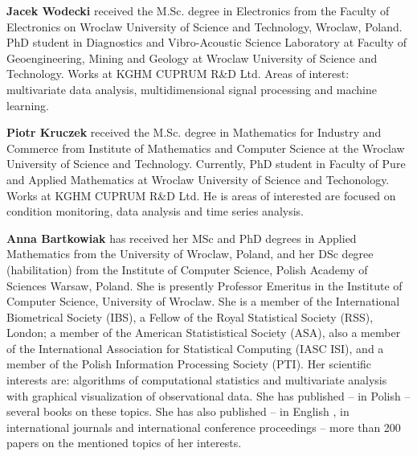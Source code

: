 \documentclass[conference,a4paper]{IEEEtran}
\begin{document}

%
%
%







\textbf{Jacek Wodecki} received the M.Sc. degree in Electronics from the Faculty of Electronics on Wroclaw University of  Science and Technology, Wroclaw, Poland. PhD student in Diagnostics and Vibro-Acoustic Science Laboratory at Faculty of Geoengineering, Mining and Geology at Wroclaw University of Science and Technology. Works at KGHM CUPRUM R\&D Ltd. Areas of interest: multivariate data analysis, multidimensional signal processing and machine learning.

\textbf{Piotr Kruczek} received the M.Sc. degree in Mathematics for Industry and Commerce from Institute of Mathematics and Computer Science at the Wroclaw University of Science and Technology. Currently, PhD student in Faculty of Pure and Applied Mathematics at Wroclaw University of Science and Techonology. Works at KGHM CUPRUM R\&D Ltd. He is areas of interested are focused on condition monitoring, data analysis and time series analysis.

\textbf{Anna Bartkowiak} has received her MSc and PhD degrees in Applied Mathematics from the University of Wroclaw, Poland,  and her DSc degree (habilitation) from the Institute of Computer Science, Polish Academy of Sciences Warsaw, Poland. She is presently Professor Emeritus in the Institute of Computer Science, University of Wroclaw. She is a member of the International Biometrical Society (IBS),  a Fellow of the Royal Statistical Society (RSS), London;  a member of the American Statististical Society (ASA), also a member of the International Association for Statistical Computing (IASC ISI), and a member of the Polish	Information Processing Society (PTI). Her scientific interests are: algorithms of computational statistics and  multivariate analysis with graphical visualization of observational data. She has published -- in Polish -- several books on these topics. She has also published -- in English , in international journals and international conference proceedings -- more than 200 papers on the mentioned topics of her interests.
\end{document}
